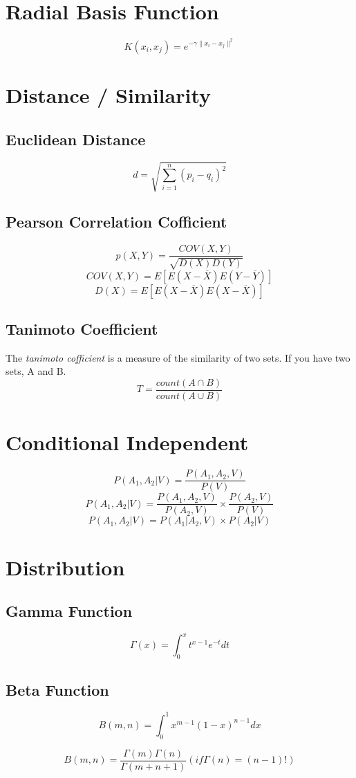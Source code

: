 \documentclass[twocolumn]{article}
\begin{document}
\section{Radial Basis Function}
\[
	K(x_i, x_j) = e^{-\gamma \|x_i - x_j \|^2}
\]

\section{Distance / Similarity}

\subsection{Euclidean Distance}
\[
	d = \sqrt{\sum_{i=1}^n (p_i - q_i)^2}
\]

\subsection{Pearson Correlation Cofficient}
\[
	p(X, Y) = \frac{COV(X, Y)}{\sqrt{D(X) D(Y)}}
\]
\[
	COV(X, Y) = E[E(X-\overline{X})E(Y-\overline{Y})]
\]
\[
	D(X) = E[E(X-\overline{X})E(X-\overline{X})]
\]

\subsection{Tanimoto Coefficient}
The \emph{tanimoto cofficient} is a measure of the similarity of two sets. If you have two sets, A and B. 
\[
	T = \frac{count(A \cap B)}{count(A \cup B)}
\]

\section{Conditional Independent}
\[P(A_1, A_2 | V) = \frac{P(A_1, A_2, V)}{P(V)} \]
\[P(A_1, A_2 | V) = \frac{P(A_1, A_2, V)}{P(A_2, V)} \times \frac{P(A_2, V)}{P(V)} \]
\[P(A_1, A_2 | V) = P(A_1 | A_2, V) \times P(A_2 | V) \]

\section{Distribution}
\subsection{Gamma Function}
\[\Gamma (x) = \int_0^xt^{x-1}e^{-t}dt \]

\subsection{Beta Function}
\[B(m,n) = \int_0^1 x^{m-1}(1-x)^{n-1}dx  \]

\[B(m,n) = \frac{\Gamma (m)\Gamma (n)}{\Gamma (m+n+1)} (if \Gamma (n) = (n-1)!) \]
\end{document}
